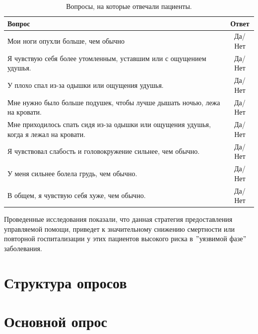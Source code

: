 \documentclass[a4paper,12pt]{article}
\begin{document}
    \begin{table}[h]
        \caption{Вопросы, на которые отвечали пациенты.}
        \label{tab:timesandtenses}
        \begin{center}
            \begin{tabular}{|V{10cm}|c|}
                \hline
                Вопрос & Ответ \\
                \hline
                Мои ноги опухли больше, чем обычно & Да/Нет \\
                \hline
                Я чувствую себя более утомленным, уставшим или с ощущением удушья.
                & Да/Нет \\
                \hline
                У плохо спал из-за одышки или ощущения удушья.
                & Да/Нет \\
                \hline
                Мне нужно было больше подушек, чтобы лучше дышать ночью, лежа на кровати.
                & Да/Нет \\
                \hline
                Мне приходилось спать сидя из-за одышки или ощущения удушья, когда я лежал на кровати.
                & Да/Нет \\
                \hline
                Я чувствовал слабость и головокружение сильнее, чем обычно.
                & Да/Нет \\
                \hline
                У меня сильнее болела грудь, чем обычно.
                & Да/Нет \\
                \hline
                В общем, я чувствую себя хуже, чем обычно.
                & Да/Нет \\
                \hline
            \end{tabular}
        \end{center}
    \end{table}

    Проведенные исследования показали, что данная стратегия предоставления управляемой помощи, приведет к значительному снижению смертности или повторной госпитализации у этих пациентов высокого риска в \("\)уязвимой фазе\("\) заболевания.


    \newpage
    \section{Структура опросов}\label{sec:-}

    \section{Основной опрос}\label{subsec:-}
\end{document}
